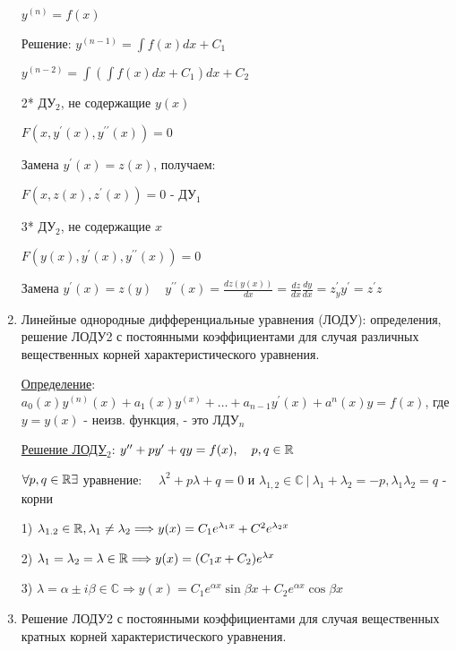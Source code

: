 \documentclass[12pt]{article}
\begin{document}
\begin{enumerate}
        $y^{(n)} = f(x)$

        Решение: $y^{(n - 1)} = \int f(x) dx + C_1$

        $y^{(n - 2)} = \int (\int f(x) dx + C_1) dx + C_2$

        2* ДУ$_2$, не содержащие $y(x)$

        $F(x, y^\prime(x), y^{\prime\prime}(x)) = 0$

        Замена $y^\prime(x) = z(x)$, получаем:

        $F(x, z(x), z^\prime(x)) = 0$ - ДУ$_1$

        3* ДУ$_2$, не содержащие $x$

        $F(y(x), y^\prime(x), y^{\prime\prime}(x)) = 0$

        Замена $y^\prime(x) = z(y) \quad y^{\prime\prime}(x) = \frac{dz(y(x))}{dx} = \frac{dz}{dx} \frac{dy}{dx} = z^\prime_y y^\prime = z^\prime z$


        \item Линейные однородные дифференциальные уравнения (ЛОДУ): определения, решение ЛОДУ2 с постоянными коэффициентами для случая различных вещественных корней характеристического уравнения.

        \hyperlink{lineardifferentialequationhigherdegree}{Определение}: $a_0(x) y^{(n)}(x) + a_1(x)y^{(x)} + \dots + a_{n - 1}y^\prime(x) + a^n(x)y = f(x)$, где $y = y(x)$ - неизв. функция, - это ЛДУ$_n$

        \hyperlink{lineardifferentialequationseconddegreewithconstants}{Решение ЛОДУ$_2$}: $y^{\prime\prime} + p y^\prime + q y = f(x), \quad p, q \in \mathbb{R}$

        $\forall p, q \in \mathbb{R} \exists $ уравнение: $\quad \lambda^2 + p\lambda + q = 0$ и $\lambda_{1,2} \in \mathbb{C} \ | \ \lambda_1 + \lambda_2 = -p, \lambda_1 \lambda_2 = q$ - корни

        1) $\lambda_{1.2} \in \mathbb{R}, \lambda_1 \neq \lambda_2 \Longrightarrow y(x) = C_1 e^{\lambda_1 x} + C^2 e^{\lambda_2 x}$

        2) $\lambda_1 = \lambda_2 = \lambda \in \mathbb{R} \Longrightarrow y(x) = (C_1 x + C_2)e^{\lambda x}$

        3) $\lambda = \alpha \pm i \beta \in \mathbb{C} \Longrightarrow y(x) = C_1 e^{\alpha x} \sin \beta x + C_2 e^{\alpha x} \cos \beta x$

        \item Решение ЛОДУ2 с постоянными коэффициентами для случая вещественных кратных корней характеристического уравнения.




\end{enumerate}
\end{document}
